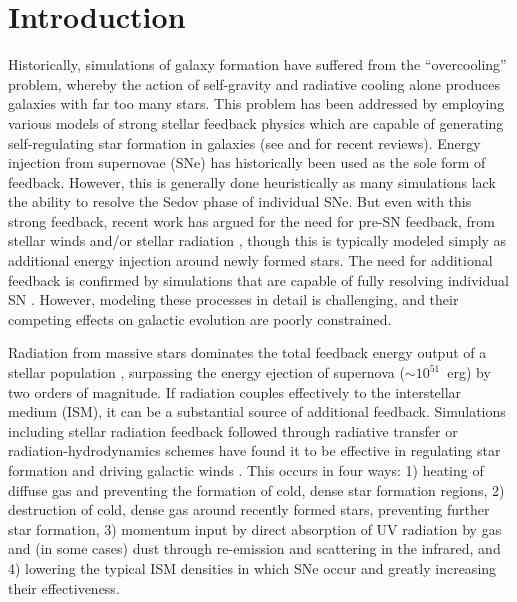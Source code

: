 \section{Introduction} \label{ch2:sec:intro}
Historically, simulations of galaxy formation have suffered from the ``overcooling'' problem, whereby the action of self-gravity and radiative cooling alone produces galaxies with far too many stars. This problem has been addressed by employing various models of strong stellar feedback physics which are capable of generating self-regulating star formation in galaxies (see \cite{SomervilleDave2015} and \cite{NaabOstriker2017} for recent reviews). Energy injection from supernovae (SNe) has historically been used as the sole form of feedback. However, this is generally done heuristically as many simulations lack the ability to resolve the Sedov phase of individual SNe. But even with this strong feedback, recent work has argued for the need for pre-SN feedback, from stellar winds and/or stellar radiation \citep[e.g.][]{Hu2016,Hopkins2018}, though this is typically modeled simply as additional energy injection around newly formed stars. The need for additional feedback is confirmed by simulations that are capable of fully resolving individual SN \citep[e.g.][]{Peters2017,Smith2018a,Smith2018b,Hu2018}. However, modeling these processes in detail is challenging, and their competing effects on galactic evolution are poorly constrained.

Radiation from massive stars dominates the total feedback energy output of a stellar population \citep[e.g.][]{Abbott1982,Leitherer1999,Agertz2013}, surpassing the energy ejection of supernova ($\sim 10^{51}$~erg) by two orders of magnitude. If radiation couples effectively to the interstellar medium (ISM), it can be a substantial source of additional feedback. Simulations including stellar radiation feedback followed through radiative transfer or radiation-hydrodynamics schemes have found it to be effective in regulating star formation and driving galactic winds \citep[e.g.][]{WiseAbel2012,Kim2013a,Sales2014,Oshea2015,Rosdahl2015,Pawlik2015,Ocvirk2016,Peters2017}. This occurs in four ways: 1) heating of diffuse gas and preventing the formation of cold, dense star formation regions, 2) destruction of cold, dense gas around recently formed stars, preventing further star formation, 3) momentum input by direct absorption of UV radiation by gas and (in some cases) dust through re-emission and scattering in the infrared, and 4) lowering the typical ISM densities in which SNe occur and greatly increasing their effectiveness.

